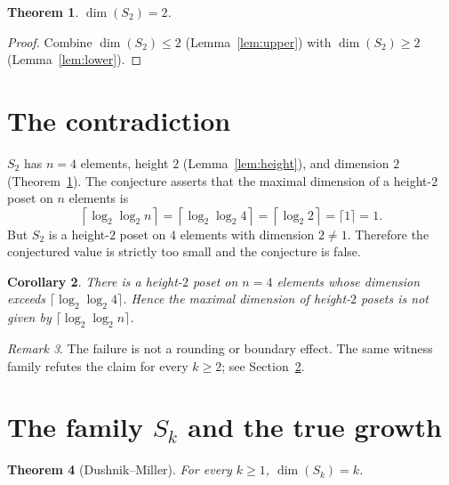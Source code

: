 \documentclass[11pt]{article}
\newtheorem{theorem}{Theorem}
\newtheorem{corollary}[theorem]{Corollary}
\theoremstyle{definition}
\theoremstyle{remark}
\newtheorem{remark}[theorem]{Remark}
\begin{document}
\begin{theorem}\label{thm:dim2}
$\dim(S_2) = 2$.
\end{theorem}

\begin{proof}
Combine $\dim(S_2) \le 2$ (Lemma~\ref{lem:upper}) with $\dim(S_2) \ge 2$
(Lemma~\ref{lem:lower}).
\end{proof}

\section{The contradiction}

$S_2$ has $n = 4$ elements, height $2$ (Lemma~\ref{lem:height}), and dimension
$2$ (Theorem~\ref{thm:dim2}). The conjecture asserts that the maximal dimension
of a height-$2$ poset on $n$ elements is
\[
\left\lceil \log_2 \log_2 n \right\rceil
= \left\lceil \log_2 \log_2 4 \right\rceil
= \left\lceil \log_2 2 \right\rceil
= \lceil 1 \rceil = 1 .
\]
But $S_2$ is a height-$2$ poset on $4$ elements with dimension $2 \neq 1$.
Therefore the conjectured value is strictly too small and the conjecture is
false.

\begin{corollary}
There is a height-$2$ poset on $n=4$ elements whose dimension exceeds
$\lceil \log_2\log_2 4\rceil$. Hence the maximal dimension of height-$2$ posets
is not given by $\lceil \log_2\log_2 n\rceil$.
\end{corollary}

\begin{remark}
The failure is not a rounding or boundary effect. The same witness family
refutes the claim for every $k \ge 2$; see Section~\ref{sec:family}.
\end{remark}

\section{The family \texorpdfstring{$S_k$}{Sk} and the true growth}\label{sec:family}

\begin{theorem}[Dushnik--Miller]\label{thm:dimSk}
For every $k \ge 1$, $\dim(S_k) = k$.
\end{theorem}
\end{document}
